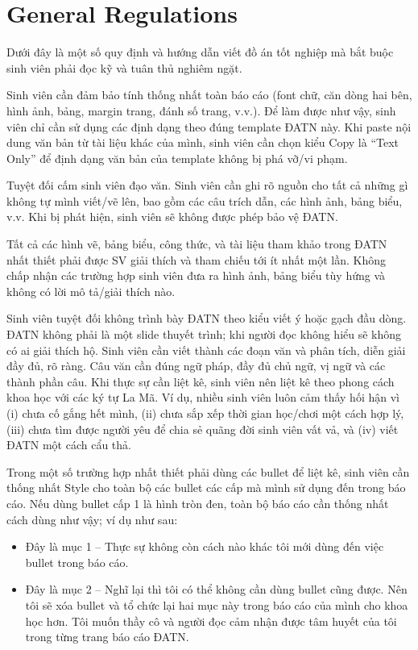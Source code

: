 \documentclass[../Main.tex]{subfiles}
\begin{document}
\section{General Regulations}
Dưới đây là một số quy định và hướng dẫn viết đồ án tốt nghiệp mà bắt buộc sinh viên phải đọc kỹ và tuân thủ nghiêm ngặt.

Sinh viên cần đảm bảo tính thống nhất toàn báo cáo (font chữ, căn dòng hai bên, hình ảnh, bảng, margin trang, đánh số trang, v.v.). Để làm được như vậy, sinh viên chỉ cần sử dụng các định dạng theo đúng template ĐATN này. Khi paste nội dung văn bản từ tài liệu khác của mình, sinh viên cần chọn kiểu Copy là “Text Only” để định dạng văn bản của template không bị phá vỡ/vi phạm.

Tuyệt đối cấm sinh viên đạo văn. Sinh viên cần ghi rõ nguồn cho tất cả những gì không tự mình viết/vẽ lên, bao gồm các câu trích dẫn, các hình ảnh, bảng biểu, v.v. Khi bị phát hiện, sinh viên sẽ không được phép bảo vệ ĐATN.

Tất cả các hình vẽ, bảng biểu, công thức, và tài liệu tham khảo trong ĐATN nhất thiết phải được SV giải thích và tham chiếu tới ít nhất một lần. Không chấp nhận các trường hợp sinh viên đưa ra hình ảnh, bảng biểu tùy hứng và không có lời mô tả/giải thích nào.

Sinh viên tuyệt đối không trình bày ĐATN theo kiểu viết ý hoặc gạch đầu dòng. ĐATN không phải là một slide thuyết trình; khi người đọc không hiểu sẽ không có ai giải thích hộ. Sinh viên cần viết thành các đoạn văn và phân tích, diễn giải đầy đủ, rõ ràng. Câu văn cần đúng ngữ pháp, đầy đủ chủ ngữ, vị ngữ và các thành phần câu.
Khi thực sự cần liệt kê, sinh viên nên liệt kê theo phong cách khoa học với các ký tự La Mã. Ví dụ, nhiều sinh viên luôn cảm thấy hối hận vì (i) chưa cố gắng hết mình, (ii) chưa sắp xếp thời gian học/chơi một cách hợp lý, (iii) chưa tìm được người yêu để chia sẻ quãng đời sinh viên vất vả, và (iv) viết ĐATN một cách cẩu thả.

Trong một số trường hợp nhất thiết phải dùng các bullet để liệt kê, sinh viên cần thống nhất Style cho toàn bộ các bullet các cấp mà mình sử dụng đến trong báo cáo. Nếu dùng bullet cấp 1 là hình tròn đen, toàn bộ báo cáo cần thống nhất cách dùng như vậy; ví dụ như sau:

\begin{itemize}
\item Đây là mục 1 – Thực sự không còn cách nào khác tôi mới dùng đến việc bullet trong báo cáo.
\item Đây là mục 2 – Nghĩ lại thì tôi có thể không cần dùng bullet cũng được. Nên tôi sẽ xóa bullet và tổ chức lại hai mục này trong báo cáo của mình cho khoa học hơn. Tôi muốn thầy cô và người đọc cảm nhận được tâm huyết của tôi trong từng trang báo cáo ĐATN.
\end{itemize}
\end{document}
